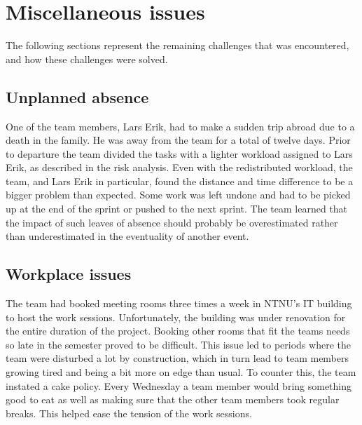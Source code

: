 \section{Miscellaneous issues}
The following sections represent the remaining challenges that was encountered, and how these challenges were solved.

\subsection{Unplanned absence}
One of the team members, Lars Erik, had to make a sudden trip abroad due to a
death in the family. He was away from the team for a total of twelve days. Prior
to departure the team divided the tasks with a lighter workload assigned to Lars
Erik, as described in the risk analysis. Even with the redistributed workload,
the team, and Lars Erik in particular, found the distance and time difference to
be a bigger problem than expected. Some work was left undone and had to be
picked up at the end of the sprint or pushed to the next sprint. The team
learned that the impact of such leaves of absence should probably be
overestimated rather than underestimated in the eventuality of another event.

\subsection{Workplace issues}
The team had booked meeting rooms three times a week in NTNU's IT building to host the work sessions. Unfortunately, the building was under renovation for the entire duration of the project. Booking other rooms that fit the teams needs so late in the semester proved to be difficult. This issue led to periods where the team were disturbed a lot by construction, which in turn lead to team members growing tired and being a bit more on edge than usual. To counter this, the team instated a cake policy. Every Wednesday a team member would bring something good to eat as well as making sure that the other team members took regular breaks. This helped ease the tension of the work sessions.

\begin{comment}
\subsection{Excessive discussion}
The team has seen that much time is being spent discussing a lot. The discussion was of importance, but it drained too much of the time. To solve this, it was decided that there should be set a certain amount of time for the discussions. Should the discussions last longer than the time set, the project leader's task was to focus on ending the discussions, and instead perform a democratic vote based on the arguments that were presented. 
\end{comment}

